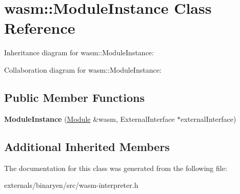 \hypertarget{classwasm_1_1_module_instance}{}\section{wasm\+:\+:Module\+Instance Class Reference}
\label{classwasm_1_1_module_instance}


Inheritance diagram for wasm\+:\+:Module\+Instance\+:


Collaboration diagram for wasm\+:\+:Module\+Instance\+:
\subsection*{Public Member Functions}
\begin{DoxyCompactItemize}
\item 
\mbox{\label{classwasm_1_1_module_instance_a78da271e26015f0013d9e0d50e493faf}} 
{\bfseries Module\+Instance} (\mbox{\hyperlink{classwasm_1_1_module}{Module}} \&wasm, External\+Interface $\ast$external\+Interface)
\end{DoxyCompactItemize}
\subsection*{Additional Inherited Members}


The documentation for this class was generated from the following file\+:\begin{DoxyCompactItemize}
\item 
externals/binaryen/src/wasm-\/interpreter.\+h\end{DoxyCompactItemize}
